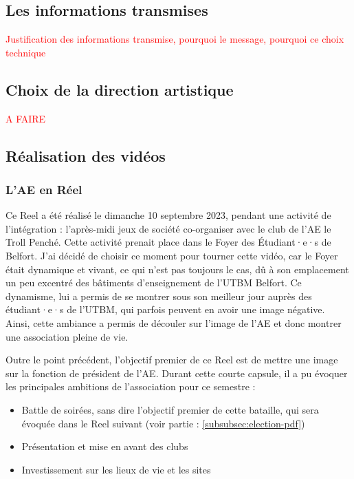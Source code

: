 \subsection{Les informations transmises}\label{subsec:les-informations-transmises}

\textcolor{red}{Justification des informations transmise, pourquoi le message, pourquoi ce choix technique}


\subsection{Choix de la direction artistique}\label{subsec:choix-de-la-direction-artistique}


\textcolor{red}{A FAIRE}




\subsection{Réalisation des vidéos}\label{subsec:realisation-des-videos}

\subsubsection{L'\gls{AE} en Réel}\label{subsubsec:ae-en-reel}

Ce Reel a été réalisé le dimanche 10 septembre 2023, pendant une activité de l'intégration : l'après-midi jeux de société co-organiser avec le club de l'\gls{AE} le Troll Penché.
Cette activité prenait place dans le Foyer des Étudiant·e·s de Belfort.
J'ai décidé de choisir ce moment pour tourner cette vidéo, car le Foyer était dynamique et vivant, ce qui n'est pas toujours le cas, dû à son emplacement un peu excentré des bâtiments d'enseignement de l'\gls{UTBM} Belfort.
Ce dynamisme, lui a permis de se montrer sous son meilleur jour auprès des étudiant·e·s de l'\gls{UTBM}, qui parfois peuvent en avoir une image négative.
Ainsi, cette ambiance a permis de découler sur l'image de l'\gls{AE} et donc montrer une association pleine de vie.

Outre le point précédent, l'objectif premier de ce Reel est de mettre une image sur la fonction de président de l'\gls{AE}.
Durant cette courte capsule, il a pu évoquer les principales ambitions de l'association pour ce semestre :
\begin{itemize}
    \item Battle de soirées, sans dire l'objectif premier de cette bataille, qui sera évoquée dans le Reel suivant (voir partie : \ref{subsubsec:election-pdf})
    \item Présentation et mise en avant des clubs
    \item Investissement sur les lieux de vie et les sites
\end{itemize}


